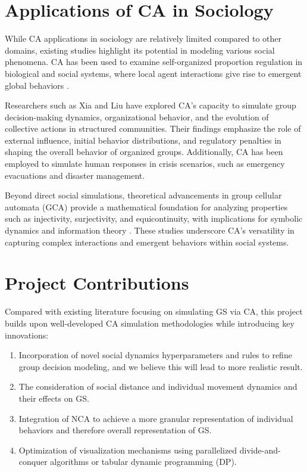 \documentclass[11pt]{article}
\begin{document}
\section*{\small Applications of CA in Sociology}
While CA applications in sociology are relatively limited compared to other domains, existing studies highlight its potential in modeling various social phenomena. CA has been used to examine self-organized proportion regulation in biological and social systems, where local agent interactions give rise to emergent global behaviors \cite{beaur_Effective_2023}.

Researchers such as Xia and Liu have explored CA’s capacity to simulate group decision-making dynamics, organizational behavior, and the evolution of collective actions in structured communities. Their findings emphasize the role of external influence, initial behavior distributions, and regulatory penalties in shaping the overall behavior of organized groups. Additionally, CA has been employed to simulate human responses in crisis scenarios, such as emergency evacuations and disaster management.

Beyond direct social simulations, theoretical advancements in group cellular automata (GCA) provide a mathematical foundation for analyzing properties such as injectivity, surjectivity, and equicontinuity, with implications for symbolic dynamics and information theory \cite{beaur_Decidability_2020}. These studies underscore CA’s versatility in capturing complex interactions and emergent behaviors within social systems.

\section*{\small Project Contributions}
Compared with existing literature focusing on simulating GS via CA,  this project builds upon well-developed CA simulation methodologies while introducing key innovations:
\begin{enumerate}[parsep=0pt, itemsep=0pt]
    \item Incorporation of novel social dynamics hyperparameters and rules to refine group decision modeling, and we believe this will lead to more realistic result.
    \item The consideration of social distance and individual movement dynamics and their effects on GS.
    \item Integration of NCA to achieve a more granular representation of individual behaviors and therefore overall representation of GS.
    \item Optimization of visualization mechanisms using parallelized divide-and-conquer algorithms or tabular dynamic programming (DP).
\end{enumerate}

\newpage
  
  
\end{document}

